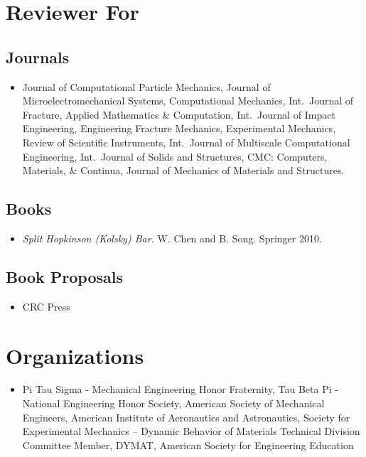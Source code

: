 \section*{Reviewer For}

\subsection*{Journals}

\begin{itemize}
    \item Journal of Computational Particle Mechanics, Journal of Microelectromechanical Systems, Computational Mechanics, Int.~Journal of Fracture, Applied Mathematics \& Computation, Int.~Journal of Impact Engineering, Engineering Fracture Mechanics, Experimental Mechanics,  Review of Scientific Instruments, Int.~Journal of Multiscale Computational Engineering, Int.~Journal of Solids and Structures, CMC: Computers, Materials, \& Continua, Journal of Mechanics of Materials and Structures.
\end{itemize}

\subsection*{Books}

\begin{itemize}
    \item {\it Split Hopkinson (Kolsky) Bar.}  W. Chen and B. Song.  Springer 2010.
\end{itemize}

\subsection*{Book Proposals}

\begin{itemize}
    \item CRC Press
\end{itemize}

\section*{Organizations}

\begin{itemize}
    \item Pi Tau Sigma - Mechanical Engineering Honor Fraternity, Tau Beta Pi - National Engineering Honor Society, American Society of Mechanical Engineers, American Institute of Aeronautics and Astronautics, Society for Experimental Mechanics -- Dynamic Behavior of Materials Technical Division Committee Member, DYMAT, American Society for Engineering Education
\end{itemize}

